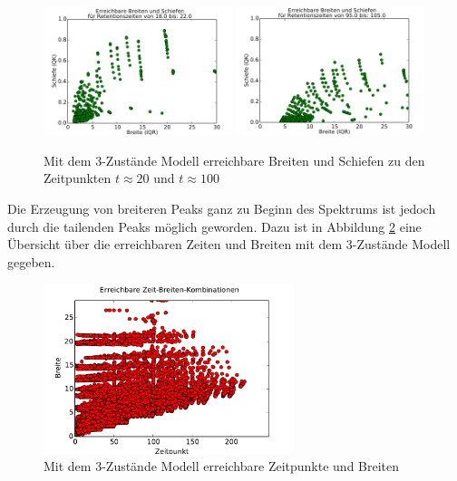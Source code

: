 \begin{figure}[h]
\centering
\includegraphics[width=0.49\textwidth]{bilder/t20erreichbar_1}
\includegraphics[width=0.49\textwidth]{bilder/t100erreichbar_1}
\caption[Mit dem 3-Zustände Modell erreichbare Breiten und Schiefen]{Mit dem 3-Zustände Modell erreichbare Breiten und Schiefen zu den Zeitpunkten $t \approx 20$ und $ t \approx 100$ }
\label{3a_erreichbar}
\end{figure}

Die Erzeugung von breiteren Peaks ganz zu Beginn des Spektrums ist jedoch durch die tailenden Peaks möglich geworden. Dazu ist in Abbildung \ref{Grenzen_3a_ohnep} eine Übersicht über die erreichbaren Zeiten und Breiten mit dem 3-Zustände Modell gegeben.

\begin{figure}[h]
\centering
\includegraphics[width=0.65\textwidth]{bilder/3a_zeitbreiten_ohnep}
\caption{Mit dem 3-Zustände Modell erreichbare Zeitpunkte und Breiten}
\label{Grenzen_3a_ohnep}
\end{figure}




